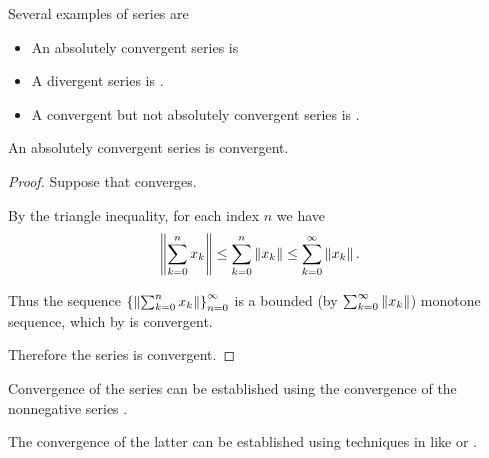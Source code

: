 \begin{example}\label{ex:series}
  Several examples of series are
  \begin{itemize}
    \item An absolutely convergent series is 
    \item A divergent series is .
    \item A convergent but not absolutely convergent series is .
  \end{itemize}
\end{example}

\begin{proposition}\label{thm:absolutely_convergent_series_is_convergent}
  An absolutely convergent series is convergent.
\end{proposition}
\begin{proof}
  Suppose that  converges.

  By the triangle inequality, for each index \( n \) we have
  \begin{equation*}
    \left\Vert \sum_{k=0}^n x_k \right\Vert \leq \sum_{k=0}^n \left\Vert x_k \right\Vert \leq \sum_{k=0}^\infty \left\Vert x_k \right\Vert.
  \end{equation*}

  Thus the sequence \( \left\{ \left\Vert \sum_{k=0}^{n} x_k \right\Vert \right\}_{n=0}^\infty \) is a bounded (by \( \sum_{k=0}^\infty \left\Vert x_k \right\Vert \)) monotone sequence, which by  is convergent.

  Therefore the series  is convergent.
\end{proof}

\begin{remark}\label{remark:establish_series_convergence_by_absolute_series}
  Convergence of the series  can be established using the convergence of the nonnegative series .

  The convergence of the latter can be established using techniques in  like  or .
\end{remark}

